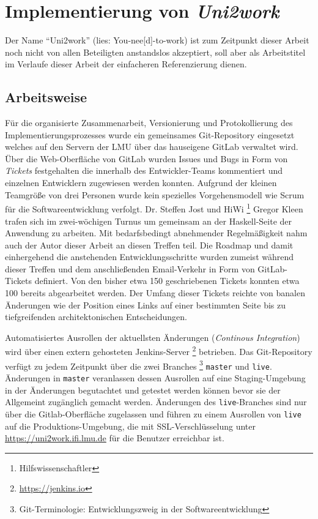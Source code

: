 \documentclass[11pt,a4paper,twoside,ngerman]{article}
\begin{document}
\clearpage
\section{Implementierung von \textit{Uni2work}} \label{sec:implementation}
Der Name "`Uni2work"' (lies: You-nee[d]-to-work) ist zum Zeitpunkt dieser Arbeit noch nicht von allen Beteiligten anstandslos akzeptiert, soll aber als Arbeitstitel im Verlaufe dieser Arbeit der einfacheren Referenzierung dienen.

\subsection{Arbeitsweise} \label{sec:workflow}
Für die organisierte Zusammenarbeit, Versionierung und Protokollierung des Implementierungsprozesses wurde ein gemeinsames Git-Repository eingesetzt welches auf den Servern der LMU über das hauseigene GitLab verwaltet wird. Über die Web-Oberfläche von GitLab wurden Issues und Bugs in Form von \textit{Tickets} festgehalten die innerhalb des Entwickler-Teams kommentiert und einzelnen Entwicklern zugewiesen werden konnten. Aufgrund der kleinen Teamgröße von drei Personen wurde kein spezielles Vorgehensmodell wie Scrum für die Softwareentwicklung verfolgt. Dr. Steffen Jost und HiWi \footnote{Hilfswissenschaftler} Gregor Kleen trafen sich im zwei-wöchigen Turnus um gemeinsam an der Haskell-Seite der Anwendung zu arbeiten. Mit bedarfsbedingt abnehmender Regelmäßigkeit nahm auch der Autor dieser Arbeit an diesen Treffen teil. Die Roadmap und damit einhergehend die anstehenden Entwicklungsschritte wurden zumeist während dieser Treffen und dem anschließenden Email-Verkehr in Form von GitLab-Tickets definiert. Von den bisher etwa 150 geschriebenen Tickets konnten etwa 100 bereits abgearbeitet werden. Der Umfang dieser Tickets reichte von banalen Änderungen wie der Position eines Links auf einer bestimmten Seite bis zu tiefgreifenden architektonischen Entscheidungen.

Automatisiertes Ausrollen der aktuellsten Änderungen (\textit{Continous Integration}) wird über einen extern gehosteten Jenkins-Server \footnote{\url{https://jenkins.io}} betrieben. Das Git-Repository verfügt zu jedem Zeitpunkt über die zwei Branches \footnote{Git-Terminologie: Entwicklungszweig in der Softwareentwicklung} \lstinline!master! und \lstinline!live!. Änderungen in \lstinline!master! veranlassen dessen Ausrollen auf eine Staging-Umgebung in der Änderungen begutachtet und getestet werden können bevor sie der Allgemeint zugänglich gemacht werden. Änderungen des \lstinline!live!-Branches sind nur über die Gitlab-Oberfläche zugelassen und führen zu einem Ausrollen von \lstinline!live! auf die Produktions-Umgebung, die mit SSL-Verschlüsselung unter \url{https://uni2work.ifi.lmu.de} für die Benutzer erreichbar ist.
\end{document}
